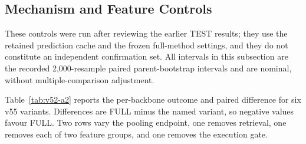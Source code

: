 \documentclass{article}
\begin{document}
\subsection{Mechanism and Feature Controls}
\label{app:estimation-analyses}
These controls were run after reviewing the earlier TEST results; they use the retained
prediction cache and the frozen full-method settings, and they do not constitute an
independent confirmation set. All intervals in this subsection are the recorded
2,000-resample paired parent-bootstrap intervals and are nominal, without
multiple-comparison adjustment.

Table~\ref{tab:v52-a2} reports the per-backbone outcome and paired difference for six v55
variants. Differences are FULL minus the named variant, so negative values favour FULL.
Two rows vary the pooling endpoint, one removes retrieval, one removes each of two feature
groups, and one removes the execution gate.
\end{document}
